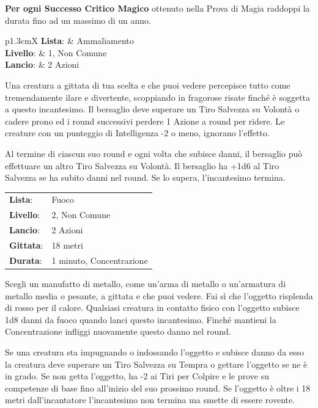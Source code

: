 \begin{multicols}{2}
\textbf{Per ogni Successo Critico Magico} ottenuto nella Prova di Magia raddoppi la durata fino ad un massimo di un anno.

\noindent\begin{tabularx}{\linewidth}{p{1.3cm}X}
	\textbf{Lista}: & Ammaliamento \\
	\textbf{Livello}: & 1, Non Comune \\
	\textbf{Lancio}: & 2 Azioni \\
\end{tabularx}\smallskip

Una creatura a gittata di tua scelta e che puoi vedere percepisce tutto come tremendamente ilare e divertente, scoppiando in fragorose risate finché è soggetta a questo incantesimo. Il bersaglio deve superare un Tiro Salvezza su Volontà o cadere prono ed i round successivi perdere 1 Azione a round per ridere. Le creature con un punteggio di Intelligenza -2 o meno, ignorano l'effetto.

Al termine di ciascun suo round e ogni volta che subisce danni, il bersaglio può effettuare un altro Tiro Salvezza su Volontà. Il bersaglio ha +1d6 al Tiro Salvezza se ha subito danni nel round. Se lo supera, l'incantesimo termina.

\noindent\begin{tabularx}{\linewidth}{p{1.3cm}X}
	\rowcolor{gray!20}\textbf{Lista}: & Fuoco \\
	\textbf{Livello}: & 2, Non Comune \\
	\rowcolor{gray!20}\textbf{Lancio}: & 2 Azioni \\
	\textbf{Gittata}: & 18 metri \\
	\rowcolor{gray!20}\textbf{Durata}: & 1 minuto, Concentrazione \\
\end{tabularx}\smallskip

Scegli un manufatto di metallo, come un'arma di metallo o un'armatura di metallo media o pesante, a gittata e che puoi vedere. Fai sì che l'oggetto risplenda di rosso per il calore. Qualsiasi creatura in contatto fisico con l'oggetto subisce 1d8 danni da fuoco quando lanci questo incantesimo. Finché mantieni la Concentrazione infliggi nuovamente questo danno nel round.

Se una creatura sta impugnando o indossando l'oggetto e subisce danno da esso la creatura deve superare un Tiro Salvezza su Tempra o gettare l'oggetto se ne è in grado. Se non getta l'oggetto, ha -2 ai Tiri per Colpire e le prove su competenze di base fino all'inizio del suo prossimo round. Se l'oggetto è oltre i 18 metri dall'incantatore l'incantesimo non termina ma smette di essere rovente.


\end{multicols}
